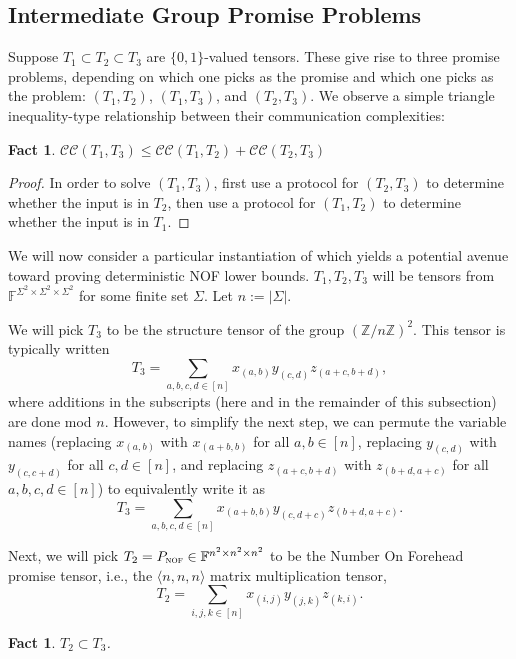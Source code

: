 \documentclass[10pt,a4paper]{article}
\newtheorem{fact}[theorem]{Fact}
\newcommand{\F}{\mathbb{F}}
\newcommand{\cc}{\mathcal{CC}}
\newcommand{\mmP}{P_{\textsc{nof}}}
\begin{document}
\subsection{Intermediate Group Promise Problems}


Suppose $T_1 \subset T_2 \subset T_3$ are $\{0, 1\}$-valued tensors. These give rise to three promise problems, depending on which one picks as the promise and which one picks as the problem: $(T_1, T_2)$, $(T_1, T_3)$, and $(T_2, T_3)$. We observe a simple triangle inequality-type relationship between their communication complexities:

\begin{fact} \label{fact:triangleineq}
    $\cc(T_1, T_3) \leq \cc(T_1, T_2) + \cc(T_2, T_3)$
\end{fact}

\begin{proof}
    In order to solve $(T_1, T_3)$, first use a protocol for $(T_2, T_3)$ to determine whether the input is in $T_2$, then use a protocol for $(T_1, T_2)$ to determine whether the input is in $T_1$.
\end{proof}

We will now consider a particular instantiation of  which yields a potential avenue toward proving deterministic NOF lower bounds. $T_1, T_2, T_3$ will be tensors from $\F^{\Sigma^2 \times \Sigma^2 \times \Sigma^2}$ for some finite set $\Sigma$. Let $n := |\Sigma|$.

We will pick $T_3$ to be the structure tensor of the group $(\mathbb{Z} / n\mathbb{Z})^2$. This tensor is typically written
$$T_3 = \sum_{a,b,c,d \in [n]} x_{(a,b)} y_{(c,d)} z_{(a+c, b+d)},$$
where additions in the subscripts (here and in the remainder of this subsection) are done mod $n$. However, to simplify the next step, we can permute the variable names (replacing $x_{(a,b)}$ with $x_{(a+b,b)}$ for all $a,b \in [n]$, replacing $y_{(c,d)}$ with $y_{(c,c+d)}$ for all $c,d \in [n]$, and replacing $z_{(a+c, b+d)}$ with $z_{(b+d, a+c)}$ for all $a,b,c,d \in [n]$) to equivalently write it as
$$T_3 = \sum_{a,b,c,d \in [n]} x_{(a+b,b)} y_{(c,d+c)} z_{(b+d, a+c)}.$$

Next, we will pick $T_2 = \mmP \in \F^{n^2 \times n^2 \times n^2}$ to be the Number On Forehead promise tensor, i.e., the $\langle n,n,n \rangle$ matrix multiplication tensor,
$$T_2 = \sum_{i,j,k \in [n]} x_{(i,j)} y_{(j,k)} z_{(k,i)}.$$

\begin{fact}
    $T_2 \subset T_3$.
\end{fact}
\end{document}
